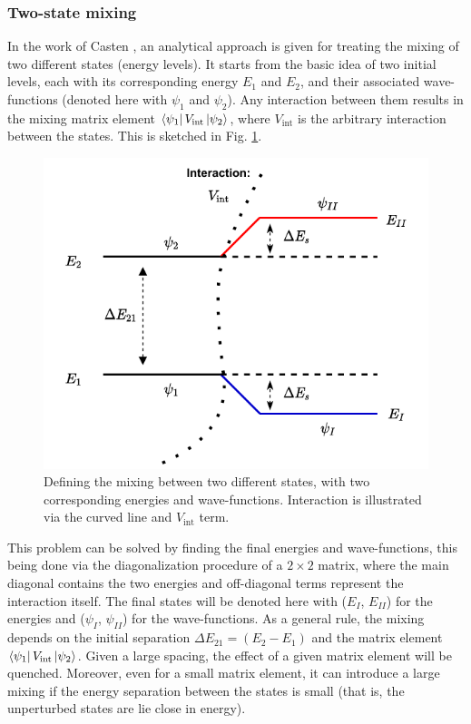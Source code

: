 \subsubsection*{Two-state mixing}

In the work of Casten \cite{casten2000nuclear}, an analytical approach is given for treating the mixing of two different states (energy levels). It starts from the basic idea of two initial levels, each with its corresponding energy $E_1$ and $E_2$, and their associated wave-functions (denoted here with $\psi_1$ and $\psi_2$). Any interaction between them results in the mixing matrix element $\bra{\psi_1}V_\text{int}\ket{\psi_2}$, where $V_\text{int}$ is the arbitrary interaction between the states. This is sketched in Fig. \ref{two-state-mixing-scheme}.

\begin{figure}
    \centering
    \includegraphics[scale=0.95]{Chapters/Figures/two-state-mixing.pdf}
    \caption{Defining the mixing between two different states, with two corresponding energies and wave-functions. Interaction is illustrated via the curved line and $V_\text{int}$ term.}
    \label{two-state-mixing-scheme}
\end{figure}

This problem can be solved by finding the final energies and wave-functions, this being done via the diagonalization procedure of a $2\times 2$ matrix, where the main diagonal contains the two energies and off-diagonal terms represent the interaction itself. The final states will be denoted here with ($E_I$, $E_{II}$) for the energies and ($\psi_I$, $\psi_{II}$) for the wave-functions. As a general rule, the mixing depends on the initial separation $\Delta E_{21}=(E_2-E_1)$ and the matrix element $\bra{\psi_1}V_\text{int}\ket{\psi_2}$. Given a large spacing, the effect of a given matrix element will be quenched. Moreover, even for a small matrix element, it can introduce a large mixing if the energy separation between the states is small (that is, the unperturbed states are lie close in energy). 

